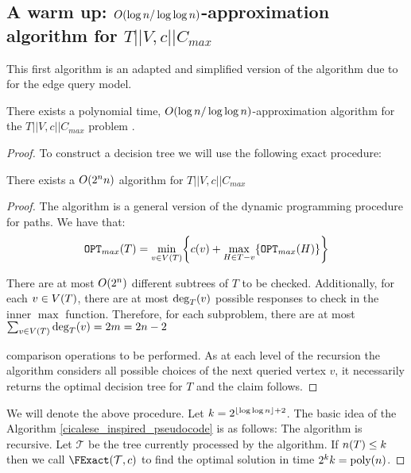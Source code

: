 
\subsection{A warm up: $O\mathopen{}\left( \log n/\log\log n \right)$-approximation algorithm  for $T||V,c||C_{max}$}
This first algorithm is an adapted and simplified version of the algorithm due to \cite{Cicalese2016OnTSPwNonUniCost} for the edge query model.
\begin{theorem}
    There exists a polynomial time, $O\mathopen{}\left( \log n/\log\log n \right)$-approximation algorithm for the $T||V,c||C_{max}$ problem .
    \begin{proof}
        
To construct a decision tree we will use the following exact procedure:
\begin{lemma}
    There exists a $O\mathopen{}\left( 2^nn \right)$ algorithm for $T||V,c||C_{max}$
    \begin{proof}
        The algorithm is a general version of the dynamic programming procedure for paths. We have that:
        $$
        \texttt{OPT}_{max}\mathopen{}\left( T \right) = \min_{v\in V\mathopen{}\left( T \right)}\mathopen{}\left\{ c\mathopen{}\left( v \right)+\max_{H\in T-v}\mathopen{}\left\{ \texttt{OPT}_{max}\mathopen{}\left( H \right) \right\} \right\}
        $$

        There are at most $O\mathopen{}\left( 2^n \right)$ different subtrees of $T$ to be checked. Additionally, for each $v\in V\mathopen{}\left( T \right)$, there are at most $\deg_T\mathopen{}\left( v \right)$ possible responses to check in the inner $\max$ function. Therefore, for each subproblem, there are at most
        $
        \sum_{v\in V\mathopen{}\left( T \right)}\deg_T\mathopen{}\left( v \right) = 2m = 2n-2
        $

        comparison operations to be performed. As at each level of the recursion the algorithm considers all possible choices of the next queried vertex $v$, it necessarily returns the optimal decision tree for $T$ and the claim follows.
    \end{proof}
\end{lemma}

We will denote the above procedure.
Let $k=2^{\mathopen{}\left\lfloor \log\log n \right\rfloor+2}$.
The basic idea of the Algorithm \ref{cicalese_inspired_pseudocode} is as follows: The algorithm is recursive. Let $\mathcal{T}$ be the tree currently processed by the algorithm. If $n\mathopen{}\left( T \right)\leq k$ then we call $\FExact\br{\mathcal{T}, c}$ to find the optimal solution in time $2^kk=\text{poly}\mathopen{}\left( n \right)$.


\end{proof}
\end{theorem}
